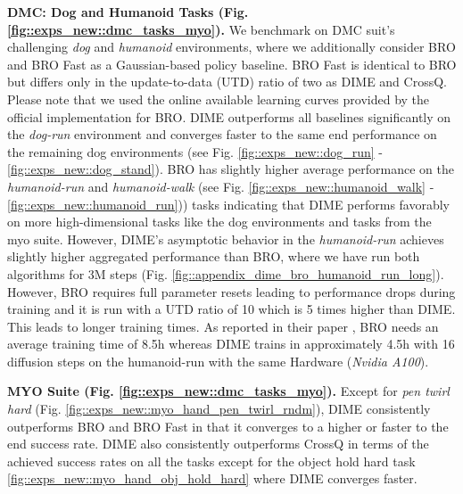\textbf{DMC: Dog and Humanoid Tasks (Fig. \ref{fig::exps_new::dmc_tasks_myo}).} 
We benchmark on DMC suit's challenging \textit{dog} and \textit{humanoid} environments, where we additionally consider BRO and BRO Fast as a Gaussian-based policy baseline. 
BRO Fast is identical to BRO but differs only in the update-to-data (UTD) ratio of two as DIME and CrossQ. 
Please note that we used the online available learning curves provided by the official implementation for BRO. 
DIME outperforms all baselines significantly on the \textit{dog-run} environment and converges faster to the same end performance on the remaining dog environments (see Fig. \ref{fig::exps_new::dog_run} - \ref{fig::exps_new::dog_stand}). BRO has slightly higher average performance on the \textit{humanoid-run} and \textit{humanoid-walk} (see Fig. \ref{fig::exps_new::humanoid_walk} - \ref{fig::exps_new::humanoid_run})) tasks indicating that DIME performs favorably on more high-dimensional tasks like the dog environments and tasks from the myo suite. However, DIME's asymptotic behavior in the \textit{humanoid-run} achieves slightly higher aggregated performance than BRO, where we have run both algorithms for 3M steps (Fig. \ref{fig::appendix_dime_bro_humanoid_run_long}). 
However, BRO requires full parameter resets leading to performance drops during training and it is run with a UTD ratio of 10 which is 5 times higher than DIME. This leads to longer training times. 
As reported in their paper \cite{nauman2024bigger}, BRO needs an average training time of 8.5h whereas DIME trains in approximately 4.5h with 16 diffusion steps on the humanoid-run with the same Hardware (\textit{Nvidia A100}).  

\textbf{MYO Suite (Fig. \ref{fig::exps_new::dmc_tasks_myo}).} Except for \textit{pen twirl hard} (Fig. \ref{fig::exps_new::myo_hand_pen_twirl_rndm}), DIME consistently outperforms BRO and BRO Fast in that it converges to a higher or faster to the end success rate. 
DIME also consistently outperforms CrossQ in terms of the achieved success rates on all the tasks except for the object hold hard task \ref{fig::exps_new::myo_hand_obj_hold_hard} where DIME converges faster. 


